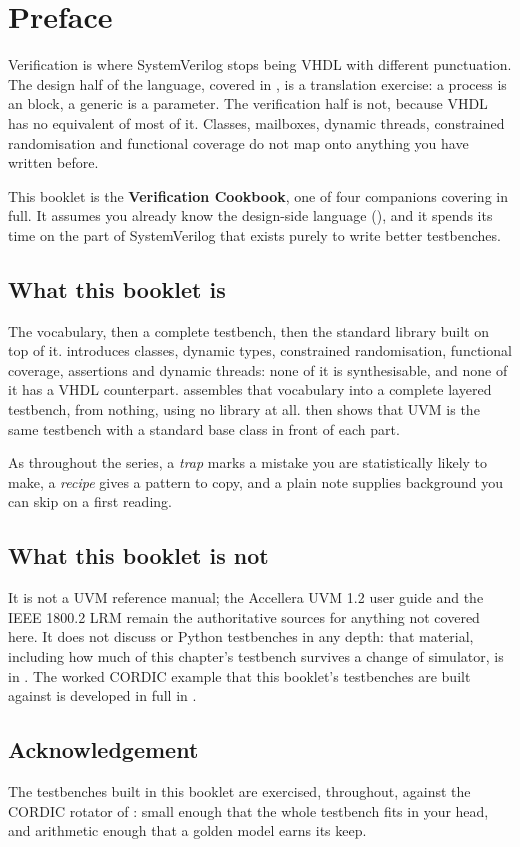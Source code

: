 \chapter*{Preface}

Verification is where SystemVerilog stops being VHDL with different
punctuation. The design half of the language, covered in , is a
translation exercise: a process is an  block, a generic is a
parameter. The verification half is not, because VHDL has no equivalent of
most of it. Classes, mailboxes, dynamic threads, constrained randomisation and
functional coverage do not map onto anything you have written before.

This booklet is the \textbf{Verification Cookbook}, one of four companions
covering  in full. It assumes you
already know the design-side language (), and it spends its
time on the part of SystemVerilog that exists purely to write better
testbenches.

\section*{What this booklet is}

The vocabulary, then a complete testbench, then the standard library built
on top of it.  introduces classes, dynamic types,
constrained randomisation, functional coverage, assertions and dynamic
threads: none of it is synthesisable, and none of it has a VHDL counterpart.
 assembles that vocabulary into a complete layered testbench,
from nothing, using no library at all.  then shows that UVM is
the same testbench with a standard base class in front of each part.

As throughout the series, a \emph{trap} marks a mistake you are
statistically likely to make, a \emph{recipe} gives a pattern to copy, and a
plain note supplies background you can skip on a first reading.

\section*{What this booklet is not}

It is not a UVM reference manual; the Accellera UVM 1.2 user guide and the
IEEE 1800.2 LRM remain the authoritative sources for anything not covered
here. It does not discuss  or Python testbenches in any
depth: that material, including how much of this chapter's testbench survives
a change of simulator, is in . The worked CORDIC example
that this booklet's testbenches are built against is developed in full in
.

\section*{Acknowledgement}

The testbenches built in this booklet are exercised, throughout, against the
CORDIC rotator of : small enough that the whole testbench fits
in your head, and arithmetic enough that a golden model earns its keep.
